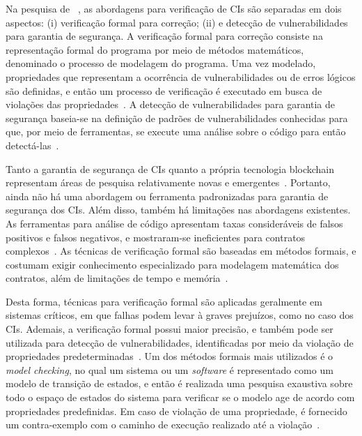 Na pesquisa de ~, as abordagens para verificação de CIs são separadas em dois aspectos: (i) verificação formal para correção; (ii) e detecção de vulnerabilidades para garantia de segurança. A verificação formal para correção consiste na representação formal do programa por meio de métodos matemáticos, denominado o processo de modelagem do programa. Uma vez modelado, propriedades que representam a ocorrência de vulnerabilidades ou de erros lógicos são definidas, e então um processo de verificação é executado em busca de violações das propriedades~\cite{almakhour2020verification-survey, singh2020survey-vulnerabilities-elsevier}. A detecção de vulnerabilidades para garantia de segurança baseia-se na definição de padrões de vulnerabilidades conhecidas para que, por meio de ferramentas, se execute uma análise sobre o código para então detectá-las~\cite{almakhour2020verification-survey}.

Tanto a garantia de segurança de CIs quanto a própria tecnologia blockchain representam áreas de pesquisa relativamente novas e emergentes~\cite{chen2020survey-ethereum-acm, kannengiesser2020trade-offs-acmcs}. Portanto, ainda não há uma abordagem ou ferramenta padronizadas para garantia de segurança dos CIs. Além disso, também há limitações nas abordagens existentes. As ferramentas para análise de código apresentam taxas consideráveis de falsos positivos e falsos negativos, e mostraram-se ineficientes para contratos complexos~\cite{kim2020automated-test-sc}. As técnicas de verificação formal são baseadas em métodos formais, e costumam exigir conhecimento especializado para modelagem matemática dos contratos, além de limitações de tempo e memória~\cite{chen2020survey-ethereum-acm}. 

Desta forma, técnicas para verificação formal são aplicadas geralmente em sistemas críticos, em que falhas podem levar à graves prejuízos, como no caso dos CIs. Ademais, a verificação formal possui maior precisão, e também pode ser utilizada para detecção de vulnerabilidades, identificadas por meio da violação de propriedades predeterminadas~\cite{wang2020formal-04, nelaturu2020verified-101, alt2018smt-87, wang2019detecting-nondeterministic-26}. Um dos métodos formais mais utilizados é o \textit{model checking}, no qual um sistema ou um \textit{software} é representado como um modelo de transição de estados, e então é realizada uma pesquisa exaustiva sobre todo o espaço de estados do sistema para verificar se o modelo age de acordo com propriedades predefinidas. Em caso de violação de uma propriedade, é fornecido um contra-exemplo com o caminho de execução realizado até a violação~\cite{clarke2018model, peled2019formal-methods}. 

